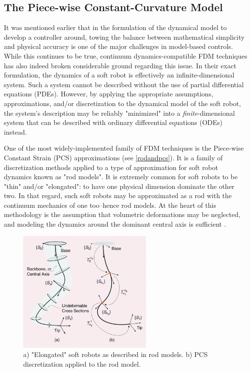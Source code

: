 \subsection{The Piece-wise Constant-Curvature Model} \label{pccmodeldef}
It was mentioned earlier that in the formulation of the dynamical model to develop a controller around, towing the balance between mathematical simplicity and physical accuracy is one of the major challenges in model-based controls. While this continues to be true, continuum dynamics-compatible FDM techniques has also indeed broken considerable ground regarding this issue. In their exact formulation, the dynamics of a soft robot is effectively an infinite-dimensional system. Such a system cannot be described without the use of partial differential equations (PDEs). However, by applying the appropriate assumptions, approximations, and/or discretization to the dynamical model of the soft robot, the system's description may be reliably "minimized" into a \textit{finite}-dimensional system that can be described with ordinary differential equations (ODEs) instead.

One of the most widely-implemented family of FDM techniques is the Piece-wise Constant Strain (PCS) approximations (see \autoref{rodandpcs}). It is a family of discretization methods applied to a type of approximation for soft robot dynamics known as "rod models". It is extremely common for soft robots to be "thin" and/or "elongated": to have one physical dimension dominate the other two. In that regard, such soft robots may be approximated as a rod with the continuum mechanics of one too--hence rod models. At the heart of this methodology is the assumption that volumetric deformations may be neglected, and modeling the dynamics around the dominant central axis is sufficient \cite{della_santina_model-based_2023}.

\begin{figure}[h!]
    \centering
    \includegraphics[width=0.6\textwidth]{graphics/roddiagram.png}
    \caption{a) "Elongated" soft robots as described in rod models. b) PCS discretization applied to the rod model. }
    \label{rodandpcs}
\end{figure}


